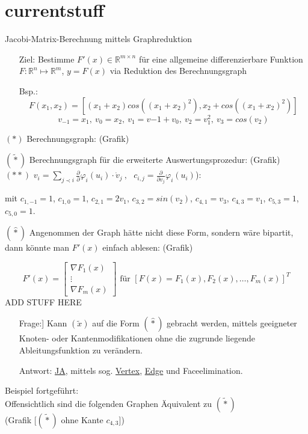 \section{currentstuff}

Jacobi-Matrix-Berechnung mittels Graphreduktion

\begin{itemize}
	\item[Ziel:] Bestimme $F'(x)\in\mathbb{R}^{m\times n}$ für eine allgemeine differenzierbare Funktion $F:\mathbb{R}^n\mapsto\mathbb{R}^m$, $y=F(x)$ via Reduktion des Berechnungsgraph
	\item[Bsp.:] $$F(x_1,x_2) = [(x_1+x_2)cos((x_1+x_2)^2),x_2 + cos((x_1+x_2)^2)]$$
	$$v_{-1} = x_1,\ v_0 = x_2,\ v_1 = v{-1}+v_0,\ v_2=v_1^2,\ v_3=cos(v_2)$$
\end{itemize}
$(*)$ Berechnungsgraph: (Grafik)\\
\vspace{2cm}

\noindent
$(\tilde{*})$ Berechnungsgraph für die erweiterte Auswertungsprozedur: (Grafik)\\
$(**)$ $v_i = \sum_{j\prec i}\frac{\partial}{\partial}\varphi_i(u_i)\cdot \dot{v}_j\ ,\ \ \ c_{i,j}=\frac{\partial}{\partial v_j}\varphi_i(u_i)$):\\
\vspace{2cm}

mit $c_{1,-1}=1$, $c_{1,0}=1$, $c_{2,1}=2v_1$, $c_{3,2}=sin(v_2)$, $c_{4,1}=v_3$, $c_{4,3}=v_1$, $c_{5,3}=1$, $c_{5,0}=1$.

\noindent
$(\hat{*})$ Angenommen der Graph hätte nicht diese Form, sondern wäre bipartit, dann könnte man $F'(x)$ einfach ablesen: (Grafik)\\
\vspace{3cm}

\noindent
$$F'(x) =
\begin{bmatrix}
	\nabla F_1(x)\\
	\vdots\\
	\nabla F_m(x)
\end{bmatrix}
\text{ für } [F(x) = F_1(x), F_2(x), \dots, F_m(x)]^T$$
ADD STUFF HERE

\begin{itemize}
	\item[]Frage:] Kann $(\tilde{x})$ auf die Form $(\hat{*})$ gebracht werden, mittels geeigneter Knoten- oder Kantenmodifikationen ohne die zugrunde liegende Ableitungsfunktion zu verändern.
	\item[Antwort:] \underline{JA}, mittels sog. \underline{Vertex}, \underline{Edge} und Faceelimination.
	
\end{itemize}
\noindent
Beispiel fortgeführt:\\
Offensichtlich sind die folgenden Graphen Äquivalent zu $(\tilde{*})$\\
(Grafik [$(\tilde{*})$ ohne Kante $c_{4,3}$])\\
\vspace{2cm}


